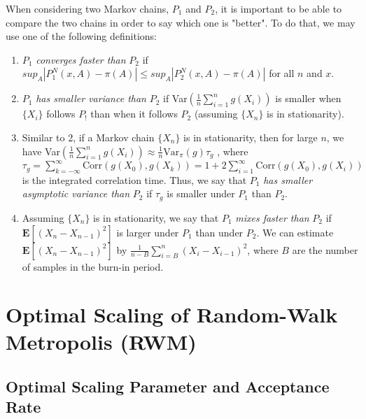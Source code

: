 \documentclass[twoside]{article}
\begin{document}
When considering two Markov chains, $P_1$ and $P_2$, it is important to be able to compare the two chains in order to say which one is "better". To do that, we may use one of the following definitions:
\begin{enumerate}
	\item $P_1$ \textit{converges faster than} $P_2$ if $sup_A|P_1^N(x,A) -  \pi(A)| \le sup_A|P_2^N(x,A) - \pi(A)|$ for all $n$ and $x$.
	\item $P_1$ \textit{has smaller variance than} $P_2$ if Var$(\frac{1}{n}\sum_{i=1}^n g(X_i))$ is smaller when $\{X_i\}$ follows $P_!$ than when it follows $P_2$ (assuming $\{X_n\}$ is in stationarity).
	\item Similar to 2, if a Markov chain $\{X_n\}$ is in stationarity, then for large $n$, we have 
	Var$(\frac{1}{n} \sum_{i=1}^n g(X_i)) \approx \frac{1}{n}\text{Var}_{\pi}(g) \tau_g$
	, where $\tau_g = \sum_{k= -\infty}^\infty \text{Corr}(g(X_0), g(X_k)) = 1 + 2 \sum_{i=1}^{\infty} \text{Corr}(g(X_0),g(X_i))$ is the integrated correlation time. Thus, we say that $P_1$ \textit{has smaller asymptotic variance than} $P_2$ if $\tau_g$ is smaller under $P_1$ than $P_2$.
	\item Assuming $\{X_n\}$ is in stationarity, we  say that $P_1$ \textit{mixes faster than} $P_2$ if $\mathbf{E}[(X_n - X_{n-1})^2]$ is larger under $P_1$ than under $P_2$. We can estimate $\mathbf{E}[(X_n - X_{n-1})^2]$ by $\frac{1}{n-B}\sum_{i=B}^n(X_i - X_{i-1})^2$, where $B$ are the number of samples in the burn-in period.
\end{enumerate}

\section{Optimal Scaling of Random-Walk Metropolis (RWM)}

\subsection{Optimal Scaling Parameter and Acceptance Rate}
\end{document}

